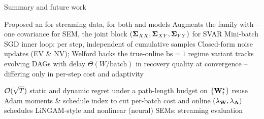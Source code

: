 \documentclass[9pt, aspectratio=169, xcolor=table]{beamer}
\begin{document}
\begin{frame}{Summary and future work}\svpos

	\bi Proposed an  for streaming data, for both  and  models
	\ai Augments the  family with  -- one covariance for SEM, the joint block $(\boldsymbol{\Sigma}_{XX},\boldsymbol{\Sigma}_{XY},\boldsymbol{\Sigma}_{YY})$ for SVAR
	\ai Mini-batch SGD inner loop:  per step, independent of cumulative samples
	\ai Closed-form noise updates (EV \& NV); Welford backs the true-online $\mathrm{bs}=1$ regime
	\ai {} variant tracks evolving DAGs with delay $\Theta(W/\mathrm{batch})$
	\ai {} in recovery quality at convergence -- differing only in per-step cost and adaptivity\ei \svpos

	\pause

	\bi {}
	\ai {} ${\mathcal O}(\sqrt{T})$ static and dynamic regret under a path-length budget on $\{{\mathbf W}^\star_t\}$
	\ai {} reuse Adam moments \& schedule index to cut per-batch cost
	\ai {} and online $(\lambda_{{\mathbf W}},\lambda_{{\mathbf A}})$ schedules
	\ai {} LiNGAM-style and nonlinear (neural) SEMs;  streaming evaluation\ei

\end{frame}

\end{document}
